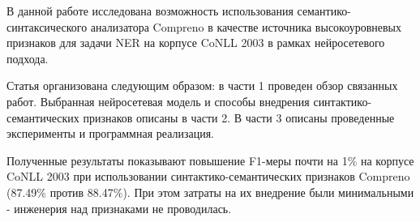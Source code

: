   В данной работе исследована возможность использования семантико-синтаксического
  анализатора Compreno в качестве источника высокоуровневых признаков для задачи
  NER на корпусе CoNLL 2003 в рамках нейросетевого подхода.

  Статья организована следующим образом: в части 1 проведен обзор связанных работ.
  Выбранная нейросетевая модель и способы внедрения синтактико-семантических признаков описаны в части 2.
  В части 3 описаны проведенные эксперименты и программная реализация.

  Полученные результаты показывают повышение F1-меры почти на 1\% на корпусе CoNLL 2003
  при использовании синтактико-семантических признаков Compreno (87.49\% против 88.47\%).
  При этом затраты на их внедрение были минимальными - инженерия над признаками не проводилась.
